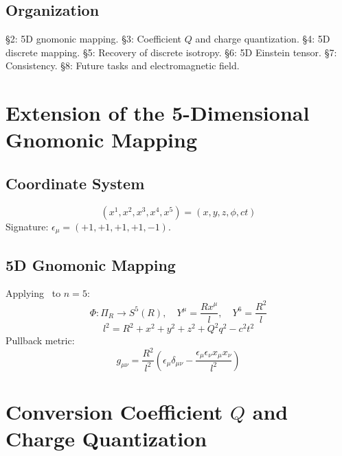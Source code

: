 \documentclass[12pt,a4paper]{article}
\begin{document}
\subsection{Organization}

\S2: 5D gnomonic mapping. \S3: Coefficient $Q$ and charge quantization. \S4: 5D discrete mapping. \S5: Recovery of discrete isotropy. \S6: 5D Einstein tensor. \S7: Consistency. \S8: Future tasks and electromagnetic field.

\section{Extension of the 5-Dimensional Gnomonic Mapping}

\subsection{Coordinate System}

\begin{equation}
(x^1, x^2, x^3, x^4, x^5) = (x, y, z, \phi, ct) \tag{2.1}
\end{equation}
Signature: $\epsilon_\mu = (+1,+1,+1,+1,-1)$.

\subsection{5D Gnomonic Mapping}

Applying~\cite{Paper1} to $n=5$:
\begin{equation}
\Phi: \Pi_R \to S^5(R), \quad Y^\mu = \frac{Rx^\mu}{l}, \quad Y^6 = \frac{R^2}{l} \tag{2.3}
\end{equation}
\begin{equation}
l^2 = R^2 + x^2 + y^2 + z^2 + Q^2q^2 - c^2t^2 \tag{2.4}
\end{equation}
Pullback metric:
\begin{equation}
g_{\mu\nu} = \frac{R^2}{l^2}\left(\epsilon_\mu \delta_{\mu\nu} - \frac{\epsilon_\mu\epsilon_\nu x_\mu x_\nu}{l^2}\right) \tag{2.5}
\end{equation}

\section{Conversion Coefficient $Q$ and Charge Quantization}
\end{document}

